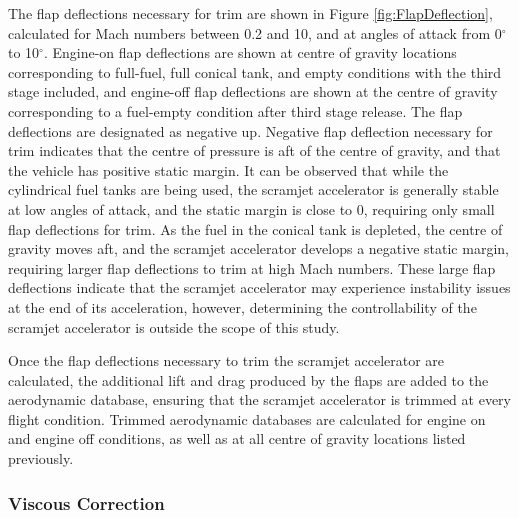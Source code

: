 		The flap deflections necessary for trim are shown in Figure \ref{fig:FlapDeflection}, calculated for Mach numbers between 0.2 and 10, and at angles of attack from 0$^\circ$ to 10$^\circ$. Engine-on flap deflections are shown at centre of gravity locations corresponding to full-fuel, full conical tank, and empty conditions with the third stage included, and engine-off flap deflections are shown at the centre of gravity corresponding to a fuel-empty condition after third stage release. 
		The flap deflections are designated as negative up. Negative flap deflection necessary for trim indicates that the centre of pressure is aft of the centre of gravity, and that the vehicle has positive static margin.
		It can be observed that while the cylindrical fuel tanks are being used, the scramjet accelerator is generally stable at low angles of attack, and the static margin is close to 0, requiring only small flap deflections for trim. As the fuel in the conical tank is depleted, the centre of gravity moves aft, and the scramjet accelerator develops a negative static margin, requiring larger flap deflections to trim at high Mach numbers. These large flap deflections indicate that the scramjet accelerator may experience instability issues at the end of its acceleration, however, determining the controllability of the scramjet accelerator is outside the scope of this study. 
		
		  Once the flap deflections necessary to trim the scramjet accelerator are calculated, the additional lift and drag produced by the flaps are added to the aerodynamic database, ensuring that the scramjet accelerator is trimmed at every flight condition.
		  Trimmed aerodynamic databases are calculated for engine on and engine off conditions, as well as at all centre of gravity locations listed previously. 
		
		
		
		\subsubsection{Viscous Correction}\label{sec:viscous}
		
